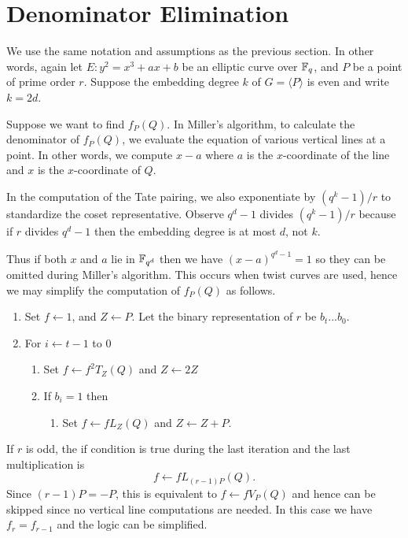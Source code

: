 \section {Denominator Elimination}

We use the same notation and assumptions as the previous section.
In other words, again let $E : y^2 = x^3 + a x + b$ be an elliptic curve
over $\mathbb{F}_q$,
and $P$ be a point of prime order $r$.
Suppose the embedding degree $k$ of $G = \langle P \rangle$ is even
and write $k = 2d$.

Suppose we want to find $f_P(Q)$.
In Miller's algorithm, to calculate the denominator of
$f_P(Q)$, we evaluate the equation of various vertical lines
at a point. In other words, we compute $x - a$ where $a$ is the
$x$-coordinate of the line and $x$ is the $x$-coordinate of $Q$.

In the computation of the Tate pairing, we also exponentiate by
$(q^k - 1)/r$ to standardize the coset representative. Observe
$q^d - 1$ divides $(q^k-1)/r$ because if $r$ divides $q^d - 1$ then
the embedding degree is at most $d$, not $k$.

Thus if both $x$ and $a$ lie in $\mathbb{F}_{q^d}$ then we have
$(x-a)^{q^d - 1} = 1$ so they can be omitted during Miller's algorithm.
This occurs when twist curves are used, hence we may simplify
the computation of $f_P(Q)$ as follows.

\begin{enumerate}
\item
Set $f \leftarrow 1$, and $Z \leftarrow P$.
Let the binary representation of $r$ be $b_t ... b_0$.
\item
For $i \leftarrow t-1$ to $0$
    \begin{enumerate}
    \item
    Set $f \leftarrow f^2 T_Z(Q)$ and $Z \leftarrow 2Z$
    \item
    If $b_i = 1$ then
	\begin{enumerate}
	\item
	Set $f \leftarrow f L_Z(Q)$ and $Z \leftarrow Z + P$.
	\end{enumerate}
    \end{enumerate}
\end{enumerate}

If $r$ is odd, the if condition is true during the last iteration and
the last multiplication is
\[ f \leftarrow f L_{(r-1)P}(Q) .\]
Since $(r-1)P = -P$, this is equivalent to $f \leftarrow f V_P(Q)$
and hence can be skipped since no vertical line computations are needed.
In this case we have $f_r = f_{r-1}$ and the logic can be simplified.

